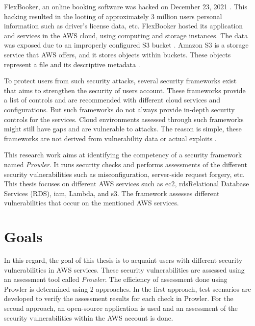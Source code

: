 \par FlexBooker, an online booking software was hacked on December 23, 2021 \cite{6}\cite{7}.
This hacking resulted in the looting of approximately 3
million
users personal information such
as driver's license data, etc.
FlexBooker hosted its application and services in the AWS cloud, using computing and storage instances.
The data was exposed due to an improperly configured S3 bucket \cite{8}.
Amazon S3 is a storage service that AWS offers, and it
stores objects within buckets.
These objects represent a file and its descriptive metadata \cite{9}.




\par  To protect users from such security attacks, several security frameworks exist that aims to strengthen the
security of users account.
These frameworks provide a list of controls and are recommended with different cloud services and
configurations.
But such frameworks do not always provide in-depth security controls for the services.
Cloud
environments assessed through such frameworks might still have gaps and are vulnerable to attacks.
The reason is simple, these frameworks are not
derived from vulnerability data or actual exploits \cite{10}.

\par This research work aims at identifying the competency of a security framework named \textit{Prowler}.
It runs security checks and performs assessments of the different security vulnerabilities such as misconfiguration,
server-side request forgery, etc.
This thesis focuses on different AWS services such as
\gls{ec2}, \gls{rds}Relational Database Services (RDS),
\gls{iam}, Lambda, and \gls{s3}. The
framework assesses different vulnerabilities that occur on the mentioned AWS services.



\section{Goals}
\par In this regard, the goal of this thesis is to acquaint users with different security vulnerabilities in AWS
services. These security vulnerabilities are assessed using an assessment tool called \textit{Prowler}. The
efficiency of assessment done using Prowler is determined using 2 approaches. In the first approach, test scenarios
are developed to verify the assessment results for each check in Prowler. For the second approach, an open-source
application is used and an assessment of the security vulnerabilities within the AWS account is done.

